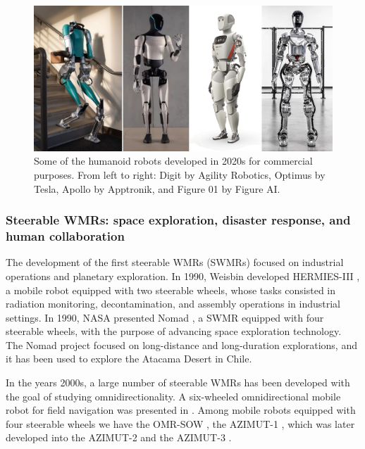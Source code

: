 \begin{figure}
    \centering
    \includegraphics[width=\textwidth]{figures/01-introduction/robots-in-2020.jpg}
    \caption{Some of the humanoid robots developed in 2020s for commercial
        purposes. From left to right:
        Digit by Agility Robotics, Optimus by Tesla, Apollo by Apptronik, and
        Figure 01 by Figure AI.
    }
    \label{fig:introduction:robots-in-2020}
\end{figure}

\subsubsection{Steerable WMRs: space exploration, disaster response, and human collaboration}
The development of the first steerable WMRs (SWMRs) focused on industrial operations and 
planetary exploration. In 1990, Weisbin developed HERMIES-III
\cite{Weisbin1990HERMIESIII}, a mobile robot equipped with two steerable 
wheels, whose tasks consisted in radiation monitoring, decontamination,
and assembly operations in industrial settings. In 1990, NASA presented Nomad
\cite{Wettergreen1999Nomad}, a SWMR equipped with four steerable wheels, with the 
purpose of advancing space exploration technology. The Nomad project focused 
on long-distance and long-duration explorations, and it has been used to 
explore the Atacama Desert in Chile.

In the years 2000s, a large number of steerable WMRs has been developed with 
the goal of studying omnidirectionality. A
six-wheeled omnidirectional mobile robot for field navigation was presented in
\cite{Moore2000Sixwheeledrobot}. Among mobile robots equipped with four 
steerable wheels we have the OMR-SOW \cite{Song2004OMR-SOW}, the AZIMUT-1
\cite{Michaud2005AZIMUT1}, which was later developed into the
AZIMUT-2 \cite{Lauria2006AZIMUT2} and the AZIMUT-3 \cite{Clavien2010AZIMUT3}.

